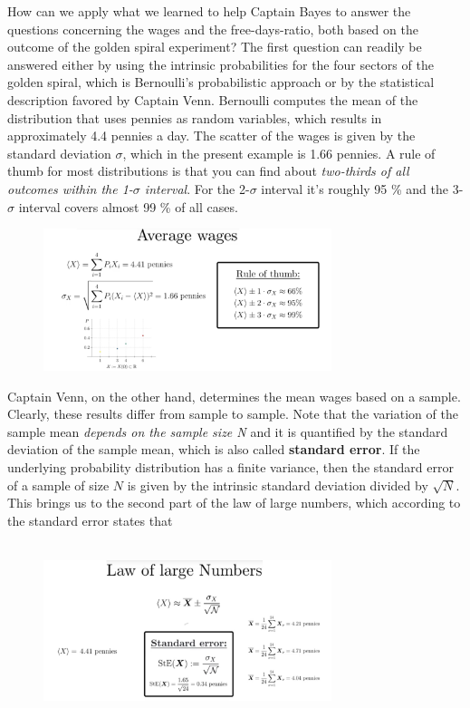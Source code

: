\documentclass[12pt, a4paper]{scrartcl}
\begin{document}
How can we apply what we learned to help Captain Bayes to answer the questions concerning the wages and the free-days-ratio, both based on the outcome of the golden spiral experiment?
The first question can readily be answered either by using the intrinsic probabilities for the four sectors of the golden spiral, which is Bernoulli’s probabilistic approach or by the statistical description favored by Captain Venn.
Bernoulli computes the mean of the distribution that uses pennies as random variables, which results in approximately 4.4 pennies a day.
The scatter of the wages is given by the standard deviation $\sigma$, which in the present example is 1.66 pennies.
A rule of thumb for most distributions is that you can find about \textit{two-thirds of all outcomes within the 1-$\sigma$ interval}. For the 2-$\sigma$ interval it's roughly 95 \% and the 3-$\sigma$ interval covers almost 99 \% of all cases.
\begin{figure}[H]
	\centering
	\includegraphics[width=0.75\textwidth]{2_10.png}
\end{figure}
Captain Venn, on the other hand, determines the mean wages based on a sample. Clearly, these results differ from sample to sample.
Note that the variation of the sample mean \textit{depends on the sample size N} and it is quantified by the standard deviation of the sample mean, which is also called \textbf{standard error}.
If the underlying probability distribution has a finite variance, then the standard error of a sample of size $N$ is given by the intrinsic standard deviation divided by $\sqrt{N}$.\\%

This brings us to the second part of the law of large numbers, which according to the standard error states that \\

\\
\begin{figure}[H]
	\centering
	\includegraphics[width=0.75\textwidth]{2_11.png}
\end{figure}
\end{document}
